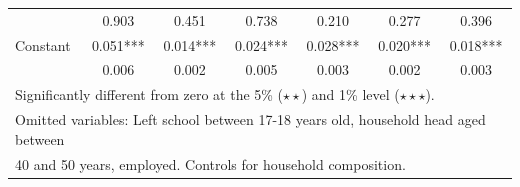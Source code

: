 \begin{table}
\begin{tabular}{l|ccc|ccc}
	&	       0.903   	&	0.451	&	0.738	&	       0.210   	&	0.277	&	0.396	\\
Constant            	&	       0.051***	&	       0.014***	&	       0.024***	&	       0.028***	&	       0.020***	&	       0.018***	\\
                    	&	       0.006   	&	0.002	&	0.005	&	       0.003   	&	0.002	&	0.003	\\
\hline\hline
\multicolumn{7}{l}{Significantly different from zero at the 5\% ($\star\star$) and 1\% level ($\star\star\star$).} \\
\multicolumn{7}{l}{Omitted variables: Left school between 17-18 years old, household head aged between} \\
\multicolumn{7}{l}{40 and 50 years, employed. Controls for household composition.} \end{tabular}
\end{table}

